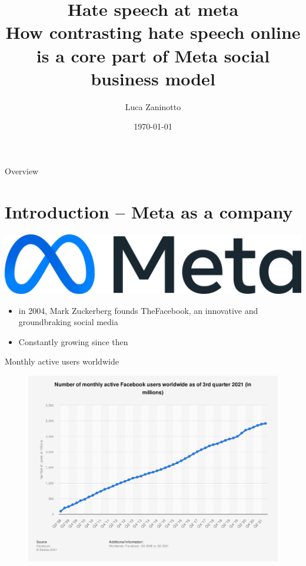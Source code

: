 \documentclass{beamer}
\title[Hate speech at meta]{Hate speech at meta\\ \footnotesize{How
    contrasting hate speech online is a core part of Meta social
    business model}}
\author{Luca Zaninotto}
\institute{Univerità di Padova}
\date{\today}
\begin{document}
\begin{frame}
  \titlepage
\end{frame}

\begin{frame}{Overview}
  \tableofcontents
\end{frame}

\section{Introduction -- Meta as a company}
\begin{frame}
  \begin{center}
    \includegraphics[width=.5\textwidth]{images/meta_logo}
    \vfill
    \begin{itemize}
    \item in 2004, Mark Zuckerberg founds TheFacebook, an innovative
      and groundbraking social media
    \item Constantly growing since then
    \end{itemize}
    \vfill
  \end{center}
\end{frame}

\begin{frame}{Monthly active users worldwide}
  \begin{figure}
    \includegraphics[width=.8\textwidth]{images/statista_MAU.png}
  \end{figure}
\end{frame}
\end{document}
